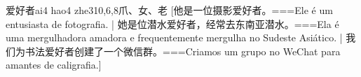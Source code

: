 \begin{EntryWithPhonetic}{爱好者}{ai4 hao4 zhe3}{10,6,8}{⽖、⼥、⽼}
  [他是一位摄影爱好者。===Ele é um entusiasta de fotografia. | 她是位潜水爱好者，经常去东南亚潜水。===Ela é uma mergulhadora amadora e frequentemente mergulha no Sudeste Asiático.  | 我们为书法爱好者创建了一个微信群。===Criamos um grupo no WeChat para amantes de caligrafia.]
\end{EntryWithPhonetic}
